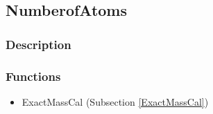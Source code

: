 \subsection{NumberofAtoms}\label{NumberofAtoms}
\subsubsection{Description}
\subsubsection{Functions}
\begin{itemize}
\item ExactMassCal (Subsection \ref{ExactMassCal})
\end{itemize}

